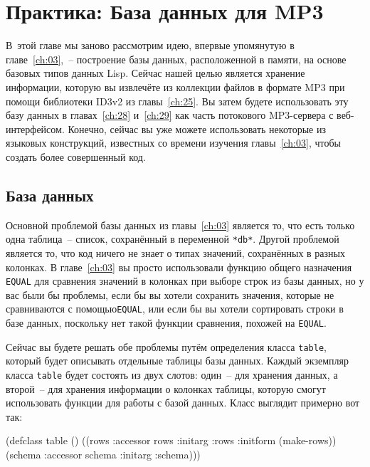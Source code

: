\chapter{Практика: База данных для MP3}
\label{ch:27}

\thispagestyle{empty}

В~этой главе мы заново рассмотрим идею, впервые упомянутую в главе~\ref{ch:03},~--
пос\-трое\-ние базы данных, расположенной в памяти, на основе базовых типов данных Lisp.
Сейчас нашей целью является хранение информации, которую вы извлечёте из коллекции файлов
в формате MP3 при помощи библиотеки ID3v2 из главы~\ref{ch:25}.  Вы затем будете
использовать эту базу данных в главах~\ref{ch:28} и~\ref{ch:29} как часть потокового
MP3-сервера с веб-интерфейсом.  Конечно, сейчас вы уже можете использовать некоторые из
языковых конструкций, известных со времени изучения главы~\ref{ch:03}, чтобы создать более
совершенный код.

\section{База данных}

Основной проблемой базы данных из главы~\ref{ch:03} является то, что есть только одна
таблица~-- список, сохранённый в переменной \lstinline{*db*}.  Другой проблемой является то,
что код ничего не знает о типах значений, сохранённых в разных колонках.  В
главе~\ref{ch:03} вы просто использовали функцию общего назначения \lstinline{EQUAL} для
сравнения значений в колонках при выборе строк из базы данных, но у вас были бы проблемы,
если бы вы хотели сохранить значения, которые не сравниваются с помощью\lstinline{EQUAL},
или если бы вы хотели сортировать строки в базе данных, поскольку нет такой функции
сравнения, похожей на \lstinline{EQUAL}.

Сейчас вы будете решать обе проблемы путём определения класса \lstinline{table}, который будет
описывать отдельные таблицы базы данных.  Каждый экземпляр класса \lstinline{table} будет
состоять из двух слотов: один~-- для хранения данных, а второй~-- для хранения информации о
колонках таблицы, которую смогут использовать функции для работы с базой данных.  Класс
выглядит примерно вот так:

\begin{myverb}
(defclass table ()
  ((rows   :accessor rows   :initarg :rows :initform (make-rows))
   (schema :accessor schema :initarg :schema)))
\end{myverb}

